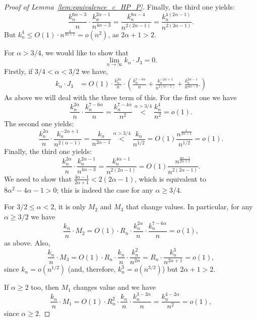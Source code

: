 \begin{proof}[Proof of Lemma~\ref{lem:equivalence_c_HP_P}]
 Finally, the third one yields: 
$$ \frac{k_n^{6\alpha -3}}{n} \cdot \frac{k_n^{2\alpha -1}}{n^{4\alpha - 3}}  
= \frac{k_n^{8\alpha -4}}{n^{2(2\alpha -1)}} = \frac{k_n^{4(2\alpha -1)}}{n^{2(2\alpha-1)}}.$$
But $k_n^4 \leq O(1)\cdot n^{\frac{4}{2\alpha+1}} = o(n^2)$, as $2\alpha +1 >2$.
 
For $\alpha >3/4$, we would like to show that 
\begin{equation} \label{eq:int3_to_prove_II}
\lim_{n \to \infty} k_n \cdot J_3 = 0. 
\end{equation}
Firstly, if $3/4 < \alpha < 3/2$ we have, 
\begin{align*} 
 k_n \cdot J_3 &= O(1) \cdot  
 \frac{k_n^{2\alpha}}{n} \cdot 
\left( 
\frac{k_n^{7-6\alpha}}{n} + \frac{k_n^{-2\alpha +1}}{n^{2(\alpha-1)}} 
+\frac{k_n^{2\alpha -1}}{n^{4\alpha - 3}}.
\right) 
\end{align*}
As above we will deal with the three term of this. 
For the first one we have 
$$  \frac{k_n^{2\alpha}}{n} \cdot 
\frac{k_n^{7-6\alpha}}{n}  = \frac{k_n^{7-4\alpha }}{n^2} \stackrel{\alpha >3/4}{<}  
\frac{k_n^{4}}{n^2} =o(1). 
$$
The second one yields: 
$$\frac{k_n^{2\alpha}}{n} \cdot 
\frac{k_n^{-2\alpha +1}}{n^{2(\alpha-1)}} =
\frac{k_n}{n^{2\alpha-1}} \stackrel{\alpha > 3/4}{<} \frac{k_n}{n^{1/2}} = O(1) 
\frac{n^{\frac{1}{2\alpha+1}}}{n^{1/2}} =o(1).$$
Finally, the third one yields: 
$$  \frac{k_n^{2\alpha}}{n} \cdot \frac{k_n^{2\alpha -1}}{n^{4\alpha - 3}}
= \frac{k_n^{4\alpha -1}}{n^{2(2\alpha -1)}}=
O(1) \frac{n^{\frac{4\alpha-1}{2\alpha+1}}}{n^{2(2\alpha -1)}}.$$
We need to show that $\frac{4\alpha-1}{2\alpha+1}< 2(2\alpha -1)$, which is 
equivalent to $8\alpha^2 - 4 \alpha -1>0$; this is indeed the case for any $\alpha \geq 3/4$. 

 
 For $3/2 \leq \alpha <2$, it is only $M_2$ and $M_3$ that change values. 
 In particular, for any $\alpha \geq 3/2$ we have 
 $$\frac{k_n}{n} \cdot M_2 =O(1)\cdot R_n \cdot \frac{k_n^{2\alpha}}{n} \cdot 
\frac{k_n^{7-6\alpha}}{n} =o(1),$$
as above. 
Also, 
$$ \frac{k_n}{n} \cdot M_3 = O(1)\cdot
R_n \cdot \frac{k_n}{n} \cdot \frac{k_n^{2}}{n^{2\alpha}}
= R_n\cdot  \frac{k_n^{3}}{n^{2\alpha +1}} = o(1),
$$
since $k_n = o(n^{1/2})$ (and, therefore, $k_n^3 = o(n^{3/2})$) but $2\alpha +1 >2$. 

If $\alpha \geq 2$ too, then $M_1$ changes value and we have 
$$\frac{k_n}{n} \cdot M_1 =O(1) \cdot R_n^2 \cdot 
\frac{k_n}{n}  \cdot \frac{k_n^{3-2\alpha}}{n} = \frac{k_n^{4 - 2\alpha}}{n^2}= o(1),$$ 
since $\alpha \geq 2$. 
 

\end{proof}
